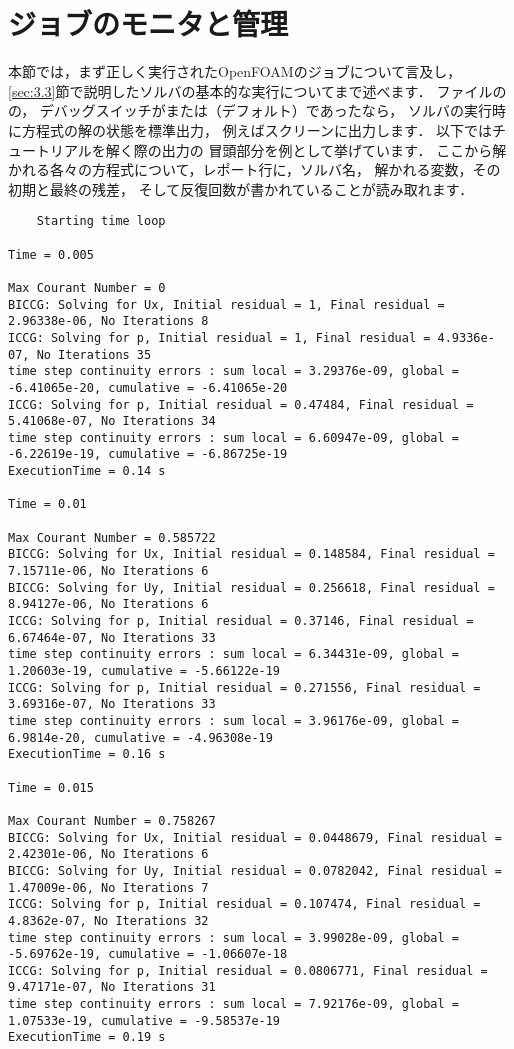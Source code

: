 \section{ジョブのモニタと管理}
\label{sec:6.6}
本節では，まず正しく実行されたOpenFOAMのジョブについて言及し，
\autoref{sec:3.3}節で説明したソルバの基本的な実行についてまで述べます．
ファイルの
の，
デバッグスイッチがまたは（デフォルト）であったなら，
ソルバの実行時に方程式の解の状態を標準出力，
例えばスクリーンに出力します．
以下ではチュートリアルを解く際の出力の
冒頭部分を例として挙げています．
ここから解かれる各々の方程式について，レポート行に，ソルバ名，
解かれる変数，その初期と最終の残差，
そして反復回数が書かれていることが読み取れます．
\begin{OFterminal}
\scriptsize
\begin{verbatim}
    Starting time loop

Time = 0.005

Max Courant Number = 0
BICCG: Solving for Ux, Initial residual = 1, Final residual = 2.96338e-06, No Iterations 8
ICCG: Solving for p, Initial residual = 1, Final residual = 4.9336e-07, No Iterations 35
time step continuity errors : sum local = 3.29376e-09, global = -6.41065e-20, cumulative = -6.41065e-20
ICCG: Solving for p, Initial residual = 0.47484, Final residual = 5.41068e-07, No Iterations 34
time step continuity errors : sum local = 6.60947e-09, global = -6.22619e-19, cumulative = -6.86725e-19
ExecutionTime = 0.14 s

Time = 0.01

Max Courant Number = 0.585722
BICCG: Solving for Ux, Initial residual = 0.148584, Final residual = 7.15711e-06, No Iterations 6
BICCG: Solving for Uy, Initial residual = 0.256618, Final residual = 8.94127e-06, No Iterations 6
ICCG: Solving for p, Initial residual = 0.37146, Final residual = 6.67464e-07, No Iterations 33
time step continuity errors : sum local = 6.34431e-09, global = 1.20603e-19, cumulative = -5.66122e-19
ICCG: Solving for p, Initial residual = 0.271556, Final residual = 3.69316e-07, No Iterations 33
time step continuity errors : sum local = 3.96176e-09, global = 6.9814e-20, cumulative = -4.96308e-19
ExecutionTime = 0.16 s

Time = 0.015

Max Courant Number = 0.758267
BICCG: Solving for Ux, Initial residual = 0.0448679, Final residual = 2.42301e-06, No Iterations 6
BICCG: Solving for Uy, Initial residual = 0.0782042, Final residual = 1.47009e-06, No Iterations 7
ICCG: Solving for p, Initial residual = 0.107474, Final residual = 4.8362e-07, No Iterations 32
time step continuity errors : sum local = 3.99028e-09, global = -5.69762e-19, cumulative = -1.06607e-18
ICCG: Solving for p, Initial residual = 0.0806771, Final residual = 9.47171e-07, No Iterations 31
time step continuity errors : sum local = 7.92176e-09, global = 1.07533e-19, cumulative = -9.58537e-19
ExecutionTime = 0.19 s
\end{verbatim}
\end{OFterminal}


